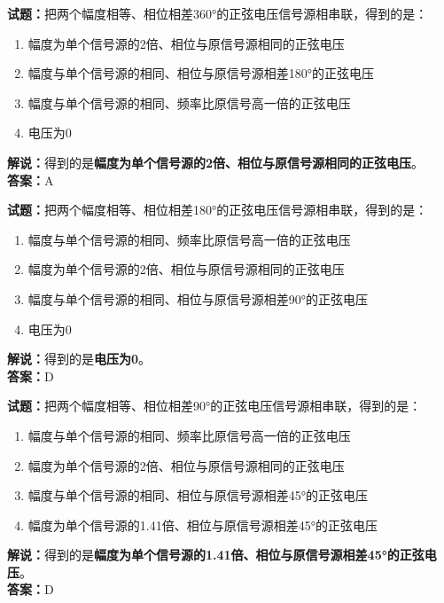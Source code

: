 \documentclass{ctexbook}
\begin{document}
\bigskip


\noindent\textbf{试题：}把两个幅度相等、相位相差360°的正弦电压信号源相串联，得到的是：
\begin{enumerate}[leftmargin=3em]
\item 幅度为单个信号源的2倍、相位与原信号源相同的正弦电压
\item 幅度与单个信号源的相同、相位与原信号源相差180°的正弦电压
\item 幅度与单个信号源的相同、频率比原信号高一倍的正弦电压
\item 电压为0
\end{enumerate}
\noindent\textbf{解说：}得到的是\textbf{幅度为单个信号源的2倍、相位与原信号源相同的正弦电压}。\\\noindent\textbf{答案：}A



\bigskip


\noindent\textbf{试题：}把两个幅度相等、相位相差180°的正弦电压信号源相串联，得到的是：
\begin{enumerate}[leftmargin=3em]
\item 幅度与单个信号源的相同、频率比原信号高一倍的正弦电压
\item 幅度为单个信号源的2倍、相位与原信号源相同的正弦电压
\item 幅度与单个信号源的相同、相位与原信号源相差90°的正弦电压
\item 电压为0
\end{enumerate}
\noindent\textbf{解说：}得到的是\textbf{电压为0}。\\\noindent\textbf{答案：}D



\bigskip


\noindent\textbf{试题：}把两个幅度相等、相位相差90°的正弦电压信号源相串联，得到的是：
\begin{enumerate}[leftmargin=3em]
\item 幅度与单个信号源的相同、频率比原信号高一倍的正弦电压
\item 幅度为单个信号源的2倍、相位与原信号源相同的正弦电压
\item 幅度与单个信号源的相同、相位与原信号源相差45°的正弦电压
\item 幅度为单个信号源的1.41倍、相位与原信号源相差45°的正弦电压
\end{enumerate}
\noindent\textbf{解说：}得到的是\textbf{幅度为单个信号源的1.41倍、相位与原信号源相差45°的正弦电压}。\\\noindent\textbf{答案：}D
\end{document}
